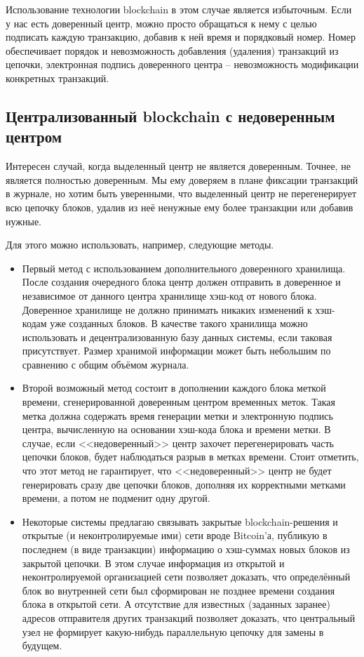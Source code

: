 Использование технологии blockchain в этом случае является избыточным. Если у нас есть доверенный центр, можно просто обращаться к нему с целью подписать каждую транзакцию, добавив к ней время и порядковый номер. Номер обеспечивает порядок и невозможность добавления (удаления) транзакций из цепочки, электронная подпись доверенного центра -- невозможность модификации конкретных транзакций.

\subsection{Централизованный blockchain с недоверенным центром}

Интересен случай, когда выделенный центр не является доверенным. Точнее, не является полностью доверенным. Мы ему доверяем в плане фиксации транзакций в журнале, но хотим быть уверенными, что выделенный центр не перегенерирует всю цепочку блоков, удалив из неё ненужные ему более транзакции или добавив нужные.

Для этого можно использовать, например, следующие методы.

\begin{itemize}
	\item Первый метод с использованием дополнительного доверенного хранилища. После создания очередного блока центр должен отправить в доверенное и независимое от данного центра хранилище хэш-код от нового блока. Доверенное хранилище не должно принимать никаких изменений к хэш-кодам уже созданных блоков. В качестве такого хранилища можно использовать и децентрализованную базу данных системы, если таковая присутствует. Размер хранимой информации может быть небольшим по сравнению с общим объёмом журнала.
	\item Второй возможный метод состоит в дополнении каждого блока меткой времени, сгенерированной доверенным центром временных меток. Такая метка должна содержать время генерации метки и электронную подпись центра, вычисленную на основании хэш-кода блока и времени метки. В случае, если <<недоверенный>> центр захочет перегенерировать часть цепочки блоков, будет наблюдаться разрыв в метках времени. Стоит отметить, что этот метод не гарантирует, что <<недоверенный>> центр не будет генерировать сразу две цепочки блоков, дополняя их корректными метками времени, а потом не подменит одну другой.
	\item Некоторые системы предлагаю связывать закрытые blockchain-решения и открытые (и неконтролируемые ими) сети вроде Bitcoin'а, публикую в последнем (в виде транзакции) информацию о хэш-суммах новых блоков из закрытой цепочки. В этом случае информация из открытой и неконтролируемой организацией сети позволяет доказать, что определённый блок во внутренней сети был сформирован не позднее времени создания блока в открытой сети. А отсутствие для известных (заданных заранее) адресов отправителя других транзакций позволяет доказать, что центральный узел не формирует какую-нибудь параллельную цепочку для замены в будущем.
\end{itemize}

